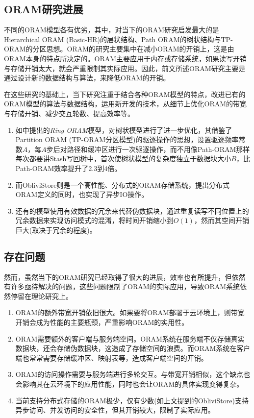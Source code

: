 \subsection{ORAM研究进展}
不同的ORAM模型各有优劣，其中，对当下的ORAM研究启发最大的是Hierarchical ORAM (Basic-HR)的层状结构、Path ORAM的树状结构与TP-ORAM的分区思想。ORAM的研究主要集中在减小ORAM的开销上，这是由ORAM本身的特点所决定的。ORAM主要应用于内存或存储系统，如果读写开销与存储开销太大，就会严重限制其实际应用。因此，前文所述ORAM研究主要是通过设计新的数据结构与算法，来降低ORAM的开销。\par
在这些研究的基础上，当下研究注重于结合各种ORAM模型的特点，改进已有的ORAM模型的算法与数据结构，运用新开发的技术，从细节上优化ORAM的带宽与存储开销、减少交互轮数、提高效率等。
\begin{enumerate}
    \item 如\cite{ref11}中提出的\textit{Ring ORAM}模型，对树状模型进行了进一步优化，其借鉴了Partition ORAM (TP-ORAM分区模型)的驱逐操作的思想，设置驱逐频率常数$A$，每$A$步后对路径和缓冲区进行一次驱逐操作，而不用像Path-ORAM那样每次都要讲Stash写回树中，首次使树状模型的复杂度独立于数据块大小$B$，比Path-ORAM效率提升了2.3到4倍\cite{ref11}。
    \item 而ObliviStore\cite{ref10}则是一个高性能、分布式的ORAM存储系统，提出分布式ORAM定义的同时，也实现了异步IO操作。
    \item 还有的模型\cite{ref12}使用有效数据的冗余来代替伪数据块，通过重复读写不同位置上的冗余数据来实现访问模式的混淆，将时间开销缩小到$O(1)$，然而其空间开销巨大(取决于冗余的程度)。
\end{enumerate}

\subsection{存在问题}
然而，虽然当下的ORAM研究已经取得了很大的进展，效率也有所提升，但依然有许多亟待解决的问题，这些问题限制了ORAM的实际应用，导致ORAM系统依然停留在理论研究上。
\begin{enumerate}
    \item ORAM的额外带宽开销依旧很大。如果要将ORAM部署于云环境上，则带宽开销会成为性能的主要瓶颈，严重影响ORAM的实用性。
    \item ORAM需要额外的客户端与服务端空间。ORAM系统在服务端不仅存储真实数据块，还会存储伪数据块，这造成了存储空间的浪费。而ORAM系统在客户端也常常需要存储缓冲区、映射表等，造成客户端空间的开销。
    \item ORAM的访问操作需要与服务端进行多轮交互。与带宽开销相似，这个缺点也会影响其在云环境下的应用性能，同时也会让ORAM的具体实现变得复杂。
    \item 当前支持分布式存储的ORAM极少，仅有少数(如上文提到的ObliviStore\cite{ref10})支持异步访问、并发访问的安全性，但其开销较大，限制了实际应用。
\end{enumerate}

